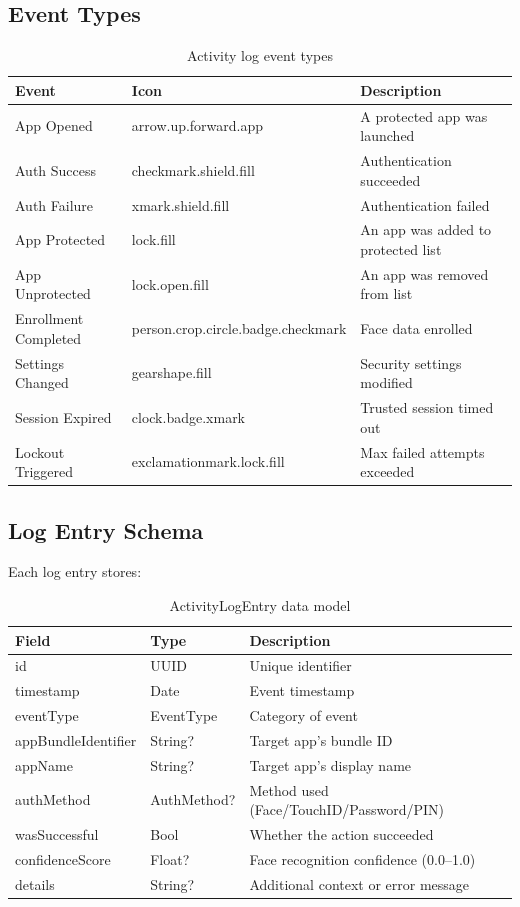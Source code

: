\documentclass[12pt,a4paper]{report}
\begin{document}
\subsection{Event Types}
\begin{table}[H]
\centering
\begin{tabular}{lll}
\toprule
\textbf{Event} & \textbf{Icon} & \textbf{Description} \\
\midrule
App Opened & arrow.up.forward.app & A protected app was launched \\
Auth Success & checkmark.shield.fill & Authentication succeeded \\
Auth Failure & xmark.shield.fill & Authentication failed \\
App Protected & lock.fill & An app was added to protected list \\
App Unprotected & lock.open.fill & An app was removed from list \\
Enrollment Completed & person.crop.circle.badge.checkmark & Face data enrolled \\
Settings Changed & gearshape.fill & Security settings modified \\
Session Expired & clock.badge.xmark & Trusted session timed out \\
Lockout Triggered & exclamationmark.lock.fill & Max failed attempts exceeded \\
\bottomrule
\end{tabular}
\caption{Activity log event types}
\end{table}

\subsection{Log Entry Schema}
Each log entry stores:
\begin{table}[H]
\centering
\begin{tabular}{lll}
\toprule
\textbf{Field} & \textbf{Type} & \textbf{Description} \\
\midrule
id & UUID & Unique identifier \\
timestamp & Date & Event timestamp \\
eventType & EventType & Category of event \\
appBundleIdentifier & String? & Target app's bundle ID \\
appName & String? & Target app's display name \\
authMethod & AuthMethod? & Method used (Face/TouchID/Password/PIN) \\
wasSuccessful & Bool & Whether the action succeeded \\
confidenceScore & Float? & Face recognition confidence (0.0--1.0) \\
details & String? & Additional context or error message \\
\bottomrule
\end{tabular}
\caption{ActivityLogEntry data model}
\end{table}
\end{document}
